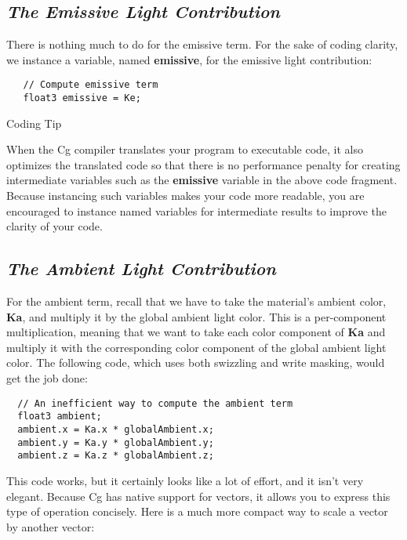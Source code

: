\documentclass[../main.tex]{subfiles}
\begin{document}
\subsection*{\textit{The Emissive Light Contribution}}

There is nothing much to do for the emissive term. For the sake of coding clarity, we instance a variable, named \textbf{emissive}, for the emissive light contribution:

\FloatBarrier
\begin{lstlisting}
   // Compute emissive term
   float3 emissive = Ke;
\end{lstlisting}
\FloatBarrier

\begin{framed}
Coding Tip

When the Cg compiler translates your program to executable code, it also optimizes the translated code so that there is no performance penalty for creating intermediate variables such as the \textbf{emissive} variable in the above code fragment. Because instancing such variables makes your code more readable, you are encouraged to instance named variables for intermediate results to improve the clarity of your code.
\end{framed}

\subsection*{\textit{The Ambient Light Contribution}}

For the ambient term, recall that we have to take the material's ambient color, \textbf{Ka}, and multiply it by the global ambient light color. This is a per-component multiplication, meaning that we want to take each color component of \textbf{Ka} and multiply it with the corresponding color component of the global ambient light color. The following code, which uses both swizzling and write masking, would get the job done:

\FloatBarrier
\begin{lstlisting}
  // An inefficient way to compute the ambient term
  float3 ambient;
  ambient.x = Ka.x * globalAmbient.x;
  ambient.y = Ka.y * globalAmbient.y;
  ambient.z = Ka.z * globalAmbient.z;
\end{lstlisting}
\FloatBarrier

This code works, but it certainly looks like a lot of effort, and it isn't very elegant. Because Cg has native support for vectors, it allows you to express this type of operation concisely. Here is a much more compact way to scale a vector by another vector:
\end{document}
